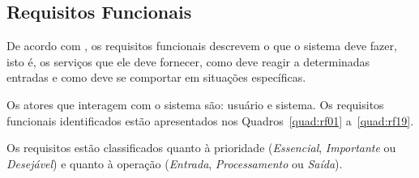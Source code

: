 \subsection{Requisitos Funcionais}

De acordo com \textcite{sommerville2011}, os requisitos funcionais descrevem o
que o sistema deve fazer, isto é, os serviços que ele deve fornecer, como deve
reagir a determinadas entradas e como deve se comportar em situações
específicas.

Os atores que interagem com o sistema são: usuário e sistema. Os requisitos
funcionais identificados estão apresentados nos Quadros~\ref{quad:rf01}
a~\ref{quad:rf19}.

Os requisitos estão classificados quanto à prioridade
(\textit{Essencial}, \textit{Importante} ou \textit{Desejável}) e
quanto à operação (\textit{Entrada}, \textit{Processamento} ou \textit{Saída}).

